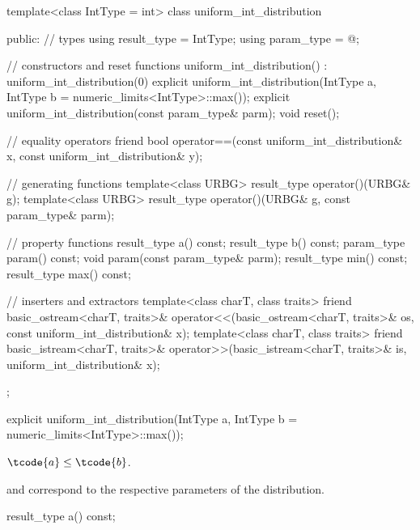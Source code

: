 %
%
\begin{codeblock}
template<class IntType = int>
  class uniform_int_distribution {
  public:
    // types
    using result_type = IntType;
    using param_type  = @\unspec@;

    // constructors and reset functions
    uniform_int_distribution() : uniform_int_distribution(0) {}
    explicit uniform_int_distribution(IntType a, IntType b = numeric_limits<IntType>::max());
    explicit uniform_int_distribution(const param_type& parm);
    void reset();

    // equality operators
    friend bool operator==(const uniform_int_distribution& x, const uniform_int_distribution& y);

    // generating functions
    template<class URBG>
      result_type operator()(URBG& g);
    template<class URBG>
      result_type operator()(URBG& g, const param_type& parm);

    // property functions
    result_type a() const;
    result_type b() const;
    param_type param() const;
    void param(const param_type& parm);
    result_type min() const;
    result_type max() const;

    // inserters and extractors
    template<class charT, class traits>
      friend basic_ostream<charT, traits>&
        operator<<(basic_ostream<charT, traits>& os, const uniform_int_distribution& x);
    template<class charT, class traits>
      friend basic_istream<charT, traits>&
        operator>>(basic_istream<charT, traits>& is, uniform_int_distribution& x);
  };
\end{codeblock}


%
\begin{itemdecl}
explicit uniform_int_distribution(IntType a, IntType b = numeric_limits<IntType>::max());
\end{itemdecl}

\begin{itemdescr}
\pnum
\expects
$\tcode{a} \leq \tcode{b}$.

\pnum
\remarks
  and 
 correspond to the respective parameters of the distribution.
\end{itemdescr}

%
\begin{itemdecl}
result_type a() const;
\end{itemdecl}

